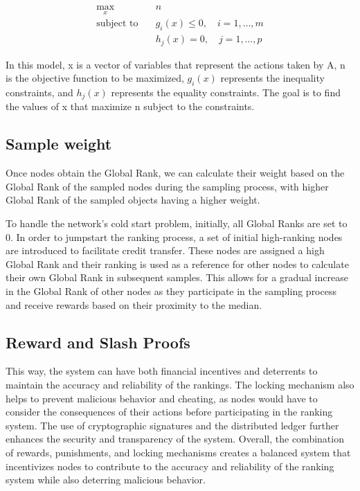 \documentclass[twocolumn]{article}
\begin{document}
\begin{align}
  \max_x \quad & n \\
  \text{subject to} \quad & g_i(x) \leq 0, \quad i = 1, \dots, m \\
  & h_j(x) = 0, \quad j = 1, \dots, p
\end{align}

In this model, x is a vector of variables that represent the actions taken by A, n is the objective function to be maximized, $g_i(x)$ represents the inequality constraints, and $h_j(x)$ represents the equality constraints. The goal is to find the values of x that maximize n subject to the constraints.


\subsection{Sample weight}
Once nodes obtain the Global Rank, we can calculate their weight based on the Global Rank of the sampled nodes during the sampling process, with higher Global Rank of the sampled objects having a higher weight.

To handle the network's cold start problem, initially, all Global Ranks are set to 0. In order to jumpstart the ranking process, a set of initial high-ranking nodes are introduced to facilitate credit transfer. These nodes are assigned a high Global Rank and their ranking is used as a reference for other nodes to calculate their own Global Rank in subsequent samples. This allows for a gradual increase in the Global Rank of other nodes as they participate in the sampling process and receive rewards based on their proximity to the median.
\subsection{Reward and Slash Proofs}

This way, the system can have both financial incentives and deterrents to maintain the accuracy and reliability of the rankings. The locking mechanism also helps to prevent malicious behavior and cheating, as nodes would have to consider the consequences of their actions before participating in the ranking system. The use of cryptographic signatures and the distributed ledger further enhances the security and transparency of the system. Overall, the combination of rewards, punishments, and locking mechanisms creates a balanced system that incentivizes nodes to contribute to the accuracy and reliability of the ranking system while also deterring malicious behavior.
\end{document}
